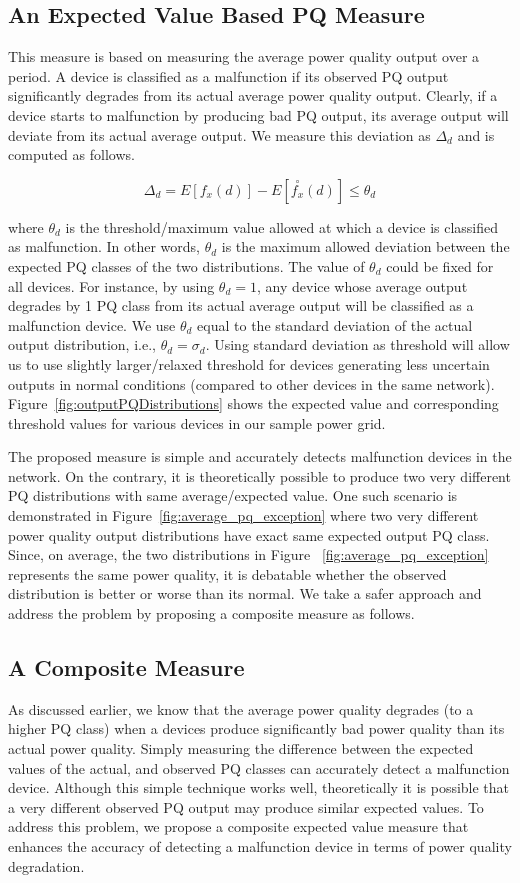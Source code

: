\subsection{An Expected Value Based PQ Measure}
This measure is based on measuring the average power quality output over a period. A device is classified as a malfunction if its observed PQ output significantly degrades from its actual average power quality output. Clearly, if a device starts to malfunction by producing bad PQ output, its average output will deviate from its actual average output. We measure this deviation as $\Delta_d$ and is computed as follows.

\[\Delta_d = E[f_x(d)] - E[\overset{\circ}{f_x}(d)] \leq \theta_d \]

\noindent where $\theta_d$ is the threshold/maximum value allowed at which a device is classified as malfunction. In other words, $\theta_d$ is the maximum allowed deviation between the expected PQ classes of the two distributions. The value of $\theta_d$ could be fixed for all devices. For instance, by using $\theta_d = 1$, any device whose average output degrades by 1 PQ class from its actual average output will be classified as a malfunction device. We use $\theta_d$ equal to the standard deviation of the actual output distribution, i.e., $\theta_d=\sigma_d$. Using standard deviation as threshold will allow us to use slightly larger/relaxed threshold for devices generating less uncertain outputs in normal conditions (compared to other devices in the same network). Figure~\ref{fig:outputPQDistributions} shows the expected value and corresponding threshold values for various devices in our sample power grid.

The proposed measure is simple and accurately detects malfunction devices in the network. On the contrary, it is theoretically possible to produce two very different PQ distributions with same average/expected value. One such scenario is demonstrated in Figure~\ref{fig:average_pq_exception} where two very different power quality output distributions have exact same expected output PQ class. Since, on average, the two distributions in Figure ~\ref{fig:average_pq_exception} represents the same power quality, it is debatable whether the observed distribution is better or worse than its normal. We take a safer approach and address the problem by proposing a composite measure as follows.

\subsection{A Composite Measure}
As discussed earlier, we know that the average power quality degrades (to a higher PQ class) when a devices produce significantly bad power quality than its actual power quality. Simply measuring the difference between the expected values of the actual, and observed PQ classes can accurately detect a malfunction device. Although this simple technique works well, theoretically it is possible that a very different observed PQ output may produce similar expected values. To address this problem, we propose a composite expected value measure that enhances the accuracy of detecting a malfunction device in terms of power quality degradation.

